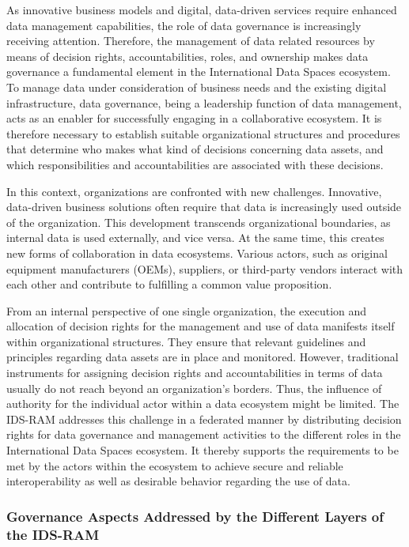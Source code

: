 As innovative business models and digital, data-driven services require enhanced data management capabilities, the role of data governance is increasingly receiving attention. Therefore, the management of data related resources by means of decision rights, accountabilities, roles, and ownership makes data governance a fundamental element in the International Data Spaces ecosystem. To manage data under consideration of business needs and the existing digital infrastructure, data governance, being a leadership function of data management, acts as an enabler for successfully engaging in a collaborative ecosystem. It is therefore necessary to establish suitable organizational structures and procedures that determine who makes what kind of decisions concerning data assets, and which responsibilities and accountabilities are associated with these decisions.

In this context, organizations are confronted with new challenges. Innovative, data-driven business solutions often require that data is increasingly used outside of the organization. This development transcends organizational boundaries, as internal data is used externally, and vice versa. At the same time, this creates new forms of collaboration in data ecosystems. Various actors, such as original equipment manufacturers (OEMs), suppliers, or third-party vendors interact with each other and contribute to fulfilling a common value proposition. 

From an internal perspective of one single organization, the execution and allocation of decision rights for the management and use of data manifests itself within organizational structures. They ensure that relevant guidelines and principles regarding data assets are in place and monitored. However, traditional instruments for assigning decision rights and accountabilities in terms of data usually do not reach beyond an organization’s borders. Thus, the influence of authority for the individual actor within a data ecosystem might be limited. The IDS-RAM addresses this challenge in a federated manner by distributing decision rights for data governance and management activities to the different roles in the International Data Spaces ecosystem. It thereby supports the requirements to be met by the actors within the ecosystem to achieve secure and reliable interoperability as well as desirable behavior regarding the use of data. 


\subsubsection{Governance Aspects Addressed by the Different Layers of the IDS-RAM}

